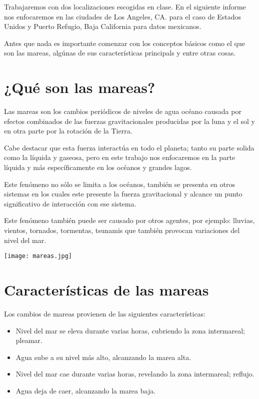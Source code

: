 Trabajaremos con dos localizaciones escogidas en clase. En el siguiente informe nos enfocaremos en las ciudades de Los Angeles, CA. para el caso de Estados Unidos y Puerto Refugio, Baja California para datos mexicanos.
\newpage

Antes que nada es importante comenzar con los conceptos básicos como el que son las mareas, algúnas de sus características principals y entre otras cosas.  

\section{¿Qué son las mareas?}
\noindent Las mareas son los cambios periódicos de niveles de agua océano causada por efectos combinados de las fuerzas gravitacionales producidas por la luna y el sol y en otra parte por la rotación de la Tierra. 

Cabe destacar que esta fuerza interactúa en todo el planeta; tanto su parte solida como la líquida y gaseosa, pero en este trabajo nos enfocaremos en la parte líquida y más específicamente en los océanos y grandes lagos. 

Este fenómeno no sólo se limita a los océanos, también se presenta en otros sistemas en los cuales este presente la fuerza gravitacional y alcance un punto significativo de interacción con ese sistema.

Este fenómeno también puede ser causado por otros agentes, por ejemplo: lluvias, vientos, tornados, tormentas, tsunamis que también provocan variaciones del nivel del mar. 


\begin{center}
\texttt{[image: mareas.jpg]}
\end{center}

\newpage

 \section{Características de las mareas}

Los cambios de mareas provienen de las siguientes características:

\begin{itemize}
\item Nivel del mar se eleva durante varias horas, cubriendo la zona intermareal; pleamar.

\item Agua sube a su nivel más alto, alcanzando la marea alta.

\item Nivel del mar cae durante varias horas, revelando la zona intermareal; reflujo.

\item Agua deja de caer, alcanzando la marea baja.
\end{itemize}

